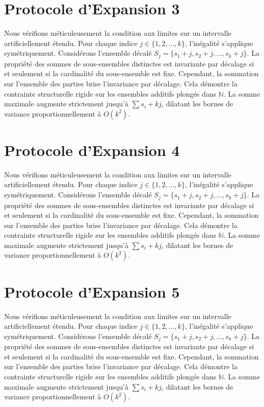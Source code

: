 \documentclass[12pt, a4paper, french]{article}
\theoremstyle{definition}
\begin{document}
\section{Protocole d'Expansion 3}
Nous vérifions méticuleusement la condition aux limites sur un intervalle artificiellement étendu. Pour chaque indice $j \in \{1, 2, \dots, k\}$, l'inégalité s'applique symétriquement. Considérons l'ensemble décalé $S_j = \{s_1 + j, s_2 + j, \dots, s_k + j\}$. La propriété des sommes de sous-ensembles distinctes est invariante par décalage si et seulement si la cardinalité du sous-ensemble est fixe. Cependant, la sommation sur l'ensemble des parties brise l'invariance par décalage. Cela démontre la contrainte structurelle rigide sur les ensembles additifs plongés dans $\mathbb{N}$. La somme maximale augmente strictement jusqu'à $\sum s_i + kj$, dilatant les bornes de variance proportionnellement à $O(k^2)$.

\section{Protocole d'Expansion 4}
Nous vérifions méticuleusement la condition aux limites sur un intervalle artificiellement étendu. Pour chaque indice $j \in \{1, 2, \dots, k\}$, l'inégalité s'applique symétriquement. Considérons l'ensemble décalé $S_j = \{s_1 + j, s_2 + j, \dots, s_k + j\}$. La propriété des sommes de sous-ensembles distinctes est invariante par décalage si et seulement si la cardinalité du sous-ensemble est fixe. Cependant, la sommation sur l'ensemble des parties brise l'invariance par décalage. Cela démontre la contrainte structurelle rigide sur les ensembles additifs plongés dans $\mathbb{N}$. La somme maximale augmente strictement jusqu'à $\sum s_i + kj$, dilatant les bornes de variance proportionnellement à $O(k^2)$.

\section{Protocole d'Expansion 5}
Nous vérifions méticuleusement la condition aux limites sur un intervalle artificiellement étendu. Pour chaque indice $j \in \{1, 2, \dots, k\}$, l'inégalité s'applique symétriquement. Considérons l'ensemble décalé $S_j = \{s_1 + j, s_2 + j, \dots, s_k + j\}$. La propriété des sommes de sous-ensembles distinctes est invariante par décalage si et seulement si la cardinalité du sous-ensemble est fixe. Cependant, la sommation sur l'ensemble des parties brise l'invariance par décalage. Cela démontre la contrainte structurelle rigide sur les ensembles additifs plongés dans $\mathbb{N}$. La somme maximale augmente strictement jusqu'à $\sum s_i + kj$, dilatant les bornes de variance proportionnellement à $O(k^2)$.
\end{document}
